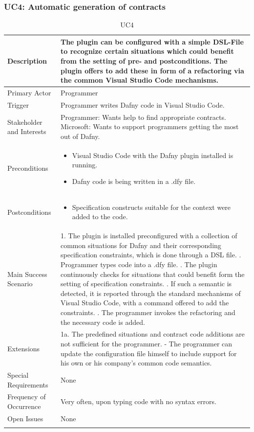 \subsubsection{UC4: Automatic generation of contracts}\label{autogen}
\begin{longtable}{l | p{} }
	Description & The plugin can be configured with a simple DSL-File to recognize certain situations which could benefit from the setting of pre- and postconditions. The plugin offers to add these in form of a refactoring via the common Visual Studio Code mechanisms.\\ \hline
	Primary Actor & Programmer\\ \hline
	Trigger & Programmer writes Dafny code in Visual Studio Code.\\ \hline
	Stakeholder and Interests & Programmer: Wants help to find appropriate contracts. \newline Microsoft: Wants to support programmers getting the most out of Dafny.\\ \hline
	Preconditions &
	\begin{itemize}
		\item Visual Studio Code with the Dafny plugin installed is running.
		\item Dafny code is being written in a .dfy file.
	\end{itemize}\\ \hline
	Postconditions &
	\begin{itemize}
		\item Specification constructs suitable for the context were added to the code.
	\end{itemize}\\ \hline
	Main Success Scenario & 
	1. The plugin is installed preconfigured with a collection of common situations for Dafny and their corresponding specification constraints, which is done through a DSL file. \newline
	2. Programmer types code into a .dfy file. \newline 
	3. The plugin continuously checks for situations that could benefit form the setting of specification constraints. \newline 
	4. If such a semantic is detected, it is reported through the standard mechanisms of Visual Studio Code, with a command offered to add the constraints. \newline
	5. The programmer invokes the refactoring and the necessary code is added.\\ \hline
	Extensions & 
	1a. The predefined situations and contract code additions are not sufficient for the programmer. \newline 
	- The programmer can update the configuration file himself to include support for his own or his company's  common code semantics. \\ \hline
	Special Requirements & None\\ \hline
	Frequency of Occurrence & Very often, upon typing code with no syntax errors.\\ \hline
	Open Issues & None \\ \hline
	\caption{UC4}
\end{longtable}


